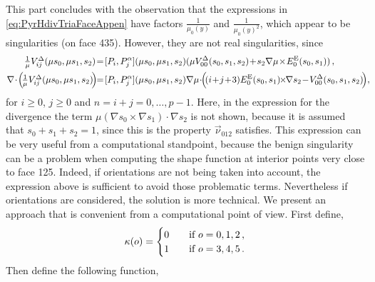 This part concludes with the observation that the expressions in \eqref{eq:PyrHdivTriaFaceAppen} have factors $\frac{1}{\mu_0(y)}$ and $\frac{1}{\mu_0(y)^2}$, which appear to be singularities (on face 435).
However, they are not real singularities, since
\begin{equation}
\begin{aligned}
	\textstyle{\frac{1}{\mu}}V_{ij}^\Tri(\mu s_0,\mu s_1, s_2)
		&\!=\![P_i,P_j^\alpha](\mu s_0,\mu s_1, s_2)(\mu V_{00}^\Tri(s_0,s_1,s_2)\!+\!s_2\nabla\mu\!\times\! E_0^\E(s_0,s_1))\,,\\
	\nabla\!\cdot\!\Big(\!\textstyle{\frac{1}{\mu}}V_{ij}^\Tri(\mu s_0,\mu s_1, s_2)\!\Big)\!
		&\!=\![P_i,P_j^\alpha](\mu s_0,\mu s_1, s_2)\nabla\mu\!\cdot\!\!
			\Big(\!(i\!+\!j\!+\!3)E_0^\E(s_0,s_1)\!\!\times\!\!\nabla s_2\!-\!V_{00}^\Tri(s_0,s_1,s_2)\!\Big)\,\!,\!\!\!\!
\end{aligned}
\label{eq:SingularityAvoidNoOri}
\end{equation}
for $i\geq0$, $j\geq0$ and $n=i+j=0,\ldots,p-1$.
Here, in the expression for the divergence the term $\mu(\nabla s_0\times\nabla s_1)\cdot\nabla s_2$ is not shown, because it is assumed that $s_0+s_1+s_2=1$, since this is the property $\vec{\nu}_{012}$ satisfies.
This expression can be very useful from a computational standpoint, because the benign singularity can be a problem when computing the shape function at interior points very close to face 125.
Indeed, if orientations are not being taken into account, the expression above is sufficient to avoid those problematic terms.
Nevertheless if orientations are considered, the solution is more technical.
We present an approach that is convenient from a computational point of view.
First define,
\begin{equation}
	\kappa(o)=\begin{cases}0\quad&\text{if }o=0,1,2\,,\\1\quad&\text{if }o=3,4,5\,.\end{cases}
\end{equation}
Then define the following function,
